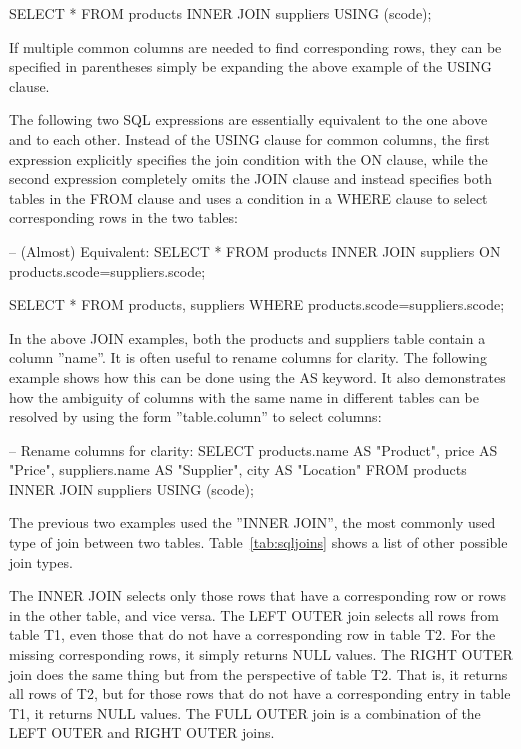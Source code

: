 \begin{sqlcode}
SELECT * FROM products INNER JOIN suppliers USING (scode);
\end{sqlcode}

If multiple common columns are needed to find corresponding rows, they can be specified in parentheses simply be expanding the above example of the USING clause.

The following two SQL expressions are essentially equivalent to the one above and to each other. Instead of the USING clause for common columns, the first expression explicitly specifies the join condition with the ON clause, while the second expression completely omits the JOIN clause and instead specifies both tables in the FROM clause and uses a condition in a WHERE clause to select corresponding rows in the two tables:

\begin{samepage}
\begin{sqlcode}
-- (Almost) Equivalent:
SELECT * FROM products 
    INNER JOIN suppliers ON products.scode=suppliers.scode;

SELECT * FROM products, suppliers 
    WHERE products.scode=suppliers.scode;
\end{sqlcode}
\end{samepage}

In the above JOIN examples, both the products and suppliers table contain a column ''name''. It is often useful to rename columns for clarity. The following example shows how this can be done using the AS keyword. It also demonstrates how the ambiguity of columns with the same name in different tables can be resolved by using the form ''table.column'' to select columns:

\begin{samepage}
\begin{sqlcode}
-- Rename columns for clarity:
SELECT products.name AS "Product", 
       price AS "Price", 
       suppliers.name AS "Supplier", 
       city AS "Location"
    FROM products INNER JOIN suppliers USING (scode);
\end{sqlcode}
\end{samepage}

The previous two examples used the ''INNER JOIN'', the most commonly used type of join between two tables. Table~\ref{tab:sqljoins} shows a list of other possible join types. 

The INNER JOIN selects only those rows that have a corresponding row or rows in the other table, and vice versa. The LEFT OUTER join selects all rows from table T1, even those that do not have a corresponding row in table T2. For the missing corresponding rows, it simply returns NULL values. The RIGHT OUTER join does the same thing but from the perspective of table T2. That is, it returns all rows of T2, but for those rows that do not have a corresponding entry in table T1, it returns NULL values. The FULL OUTER join is a combination of the LEFT OUTER and RIGHT OUTER joins.


